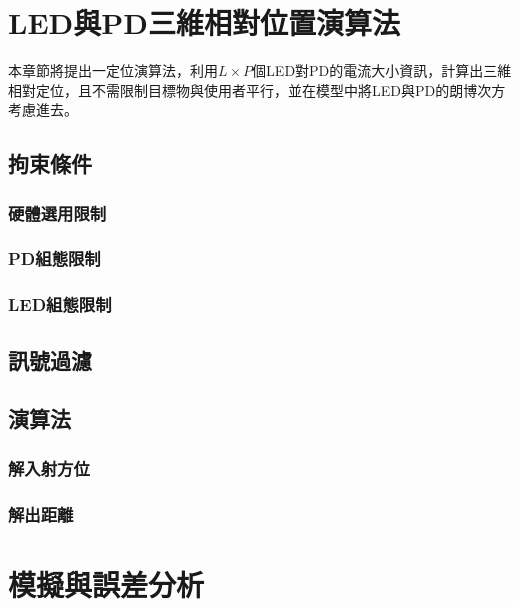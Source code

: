\chapter{LED與PD三維相對位置演算法}
\label{chp:3}



本章節將提出一定位演算法，利用$L\times P$個LED對PD的電流大小資訊，計算出三維相對定位，且不需限制目標物與使用者平行，並在模型中將LED與PD的朗博次方考慮進去。

\section{拘束條件}
    \subsection{硬體選用限制}

    \subsection{PD組態限制}
    \subsection{LED組態限制}

\section{訊號過濾}

\section{演算法}
    \subsection{解入射方位}
    \subsection{解出距離}



\chapter{模擬與誤差分析}
\label{chp:4}

